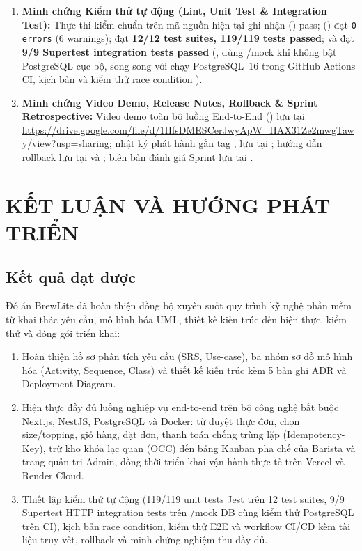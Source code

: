 \documentclass[12pt,a4paper]{report}
\begin{document}
\begin{sloppypar}
\begin{enumerate}[leftmargin=*]
\item \textbf{Minh chứng Kiểm thử tự động (Lint, Unit Test \& Integration Test):} Thực thi kiểm chuẩn trên mã nguồn hiện tại ghi nhận  () pass;  () đạt \texttt{0 errors} (6 warnings);  đạt \textbf{12/12 test suites, 119/119 tests passed}; và  đạt \textbf{9/9 Supertest integration tests passed} (, dùng /mock  khi không bật PostgreSQL cục bộ, song song với chạy PostgreSQL~16 trong GitHub Actions CI, kịch bản  và kiểm thử race condition ).

\item \textbf{Minh chứng Video Demo, Release Notes, Rollback \& Sprint Retrospective:} Video demo toàn bộ luồng End-to-End () lưu tại \url{https://drive.google.com/file/d/1HfsDMESCerJwyApW_HAX31Ze2mwgTawy/view?usp=sharing}; nhật ký phát hành gắn tag ,  lưu tại ; hướng dẫn rollback lưu tại  và ; biên bản đánh giá Sprint lưu tại .
\end{enumerate}
\end{sloppypar}

\chapter{KẾT LUẬN VÀ HƯỚNG PHÁT TRIỂN}

\section{Kết quả đạt được}
Đồ án BrewLite đã hoàn thiện đồng bộ xuyên suốt quy trình kỹ nghệ phần mềm từ khai thác yêu cầu, mô hình hóa UML, thiết kế kiến trúc đến hiện thực, kiểm thử và đóng gói triển khai:
\begin{enumerate}[leftmargin=*]
\item Hoàn thiện hồ sơ phân tích yêu cầu (SRS, Use-case), ba nhóm sơ đồ mô hình hóa (Activity, Sequence, Class) và thiết kế kiến trúc kèm 5 bản ghi ADR và Deployment Diagram.
\item Hiện thực đầy đủ luồng nghiệp vụ end-to-end trên bộ công nghệ bắt buộc Next.js, NestJS, PostgreSQL và Docker: từ duyệt thực đơn, chọn size/topping, giỏ hàng, đặt đơn, thanh toán chống trùng lặp (Idempotency-Key), trừ kho khóa lạc quan (OCC) đến bảng Kanban pha chế của Barista và trang quản trị Admin, đồng thời triển khai vận hành thực tế trên Vercel và Render Cloud.
\item Thiết lập kiểm thử tự động (119/119 unit tests Jest trên 12 test suites, 9/9 Supertest HTTP integration tests trên /mock DB cùng kiểm thử PostgreSQL trên CI), kịch bản race condition, kiểm thử E2E và workflow CI/CD kèm tài liệu truy vết, rollback và minh chứng nghiệm thu đầy đủ.
\end{enumerate}
\end{document}
